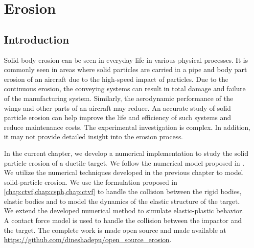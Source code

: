 \chapter{Erosion}
\label{chap:erosion}

\section{Introduction}
\label{sec:intro}
Solid-body erosion can be seen in everyday life in various physical processes.
It is commonly seen in areas where solid particles are carried in a pipe and
body part erosion of an aircraft due to the high-speed impact of particles. Due
to the continuous erosion, the conveying systems can result in total damage and
failure of the manufacturing system. Similarly, the aerodynamic performance of
the wings and other parts of an aircraft may reduce. An accurate study of solid
particle erosion can help improve the life and efficiency of such systems and
reduce maintenance costs. The experimental investigation is complex. In
addition, it may not provide detailed insight into the erosion process.

In the current chapter, we develop a numerical implementation to study the solid
particle erosion of a ductile target. We follow the numerical model proposed in
\citep{takaffoli2009finite,dong2016smoothed}. We utilize the numerical
techniques developed in the previous chapter to model solid-particle erosion. We
use the formulation proposed in \cref{chap:ctvf,chap:csph,chap:ctvf} to handle
the collision between the rigid bodies, elastic bodies and to model the dynamics
of the elastic structure of the target. We extend the developed numerical method
to simulate elastic-plastic behavior. A contact force model is used to handle
the collision between the impactor and the target. The complete work is made
open source and made available at
\url{https://github.com/dineshadepu/open_source_erosion}.

